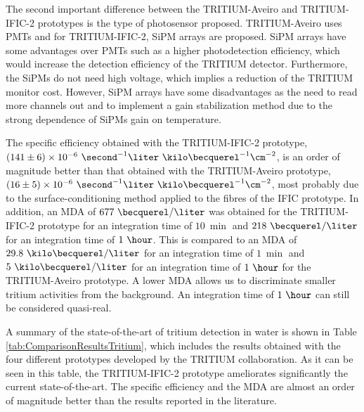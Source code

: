 \begin{enumerate}
The second important difference between the TRITIUM-Aveiro and TRITIUM-IFIC-2 prototypes is the type of photosensor proposed. TRITIUM-Aveiro uses PMTs and for TRITIUM-IFIC-2, SiPM arrays are proposed. SiPM arrays have some advantages over PMTs such as a higher photodetection efficiency, which would increase the detection efficiency of the TRITIUM detector. Furthermore, the SiPMs do not need high voltage, which implies a reduction of the TRITIUM monitor cost. However, SiPM arrays have some disadvantages as the need to read more channels out and to implement a gain stabilization method due to the strong dependence of SiPMs gain on temperature.

The specific efficiency obtained with the TRITIUM-IFIC-2 prototype, $(141 \pm 6) \times 10^{-6}~ \second^{-1}  \liter ~ \kilo\becquerel^{-1} \cm^{-2}$, is an order of magnitude better than that obtained with the TRITIUM-Aveiro prototype, $(16 \pm 5)\times 10^{-6}~ \second^{-1}  \liter ~ \kilo\becquerel^{-1} \cm^{-2}$, most probably due to the surface-conditioning method applied to the fibres of the IFIC prototype. In addition, an MDA of $677~\becquerel/\liter$ was obtained for the TRITIUM-IFIC-2 prototype for an integration time of $10~\min$ and $218~\becquerel/\liter$ for an integration time of $1~\hour$. This is compared to an MDA of $29.8~\kilo\becquerel/\liter$ for an integration time of $1~\min$ and $5~\kilo\becquerel/\liter$ for an integration time of $1~\hour$ for the TRITIUM-Aveiro prototype. A lower MDA allows us to discriminate smaller tritium activities from the background. An integration time of $1~\hour$ can still be considered quasi-real.

A summary of the state-of-the-art of tritium detection in water is shown in Table \ref{tab:ComparisonResultsTritium}, which includes the results obtained with the four different prototypes developed by the TRITIUM collaboration. As it can be seen in this table, the TRITIUM-IFIC-2 prototype ameliorates significantly the current state-of-the-art. The specific efficiency and the MDA are almost an order of magnitude better than the results reported in the literature.


\end{enumerate}
